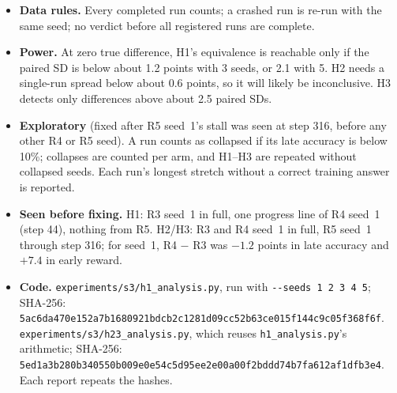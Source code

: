 \documentclass[11pt]{article}
\begin{document}
\begin{itemize}
\item \textbf{Data rules.} Every completed run counts; a crashed run is re-run with the same seed; no verdict before all registered runs are complete.
\item \textbf{Power.} At zero true difference, H1's equivalence is reachable only if the paired SD is below about 1.2 points with 3 seeds, or 2.1 with 5. H2 needs a single-run spread below about 0.6 points, so it will likely be inconclusive. H3 detects only differences above about 2.5 paired SDs.
\item \textbf{Exploratory} (fixed after R5 seed~1's stall was seen at step 316, before any other R4 or R5 seed). A run counts as collapsed if its late accuracy is below 10\%; collapses are counted per arm, and H1--H3 are repeated without collapsed seeds. Each run's longest stretch without a correct training answer is reported.
\item \textbf{Seen before fixing.} H1: R3 seed~1 in full, one progress line of R4 seed~1 (step 44), nothing from R5. H2/H3: R3 and R4 seed~1 in full, R5 seed~1 through step 316; for seed~1, R4 $-$ R3 was $-1.2$ points in late accuracy and $+7.4$ in early reward.
\item \textbf{Code.} \texttt{experiments/s3/h1\_analysis.py}, run with \texttt{-{}-seeds 1 2 3 4 5}; SHA-256:\\ \texttt{\small 5ac6da470e152a7b1680921bdcb2c1281d09cc52b63ce015f144c9c05f368f6f}.\\ \texttt{experiments/s3/h23\_analysis.py}, which reuses \texttt{h1\_analysis.py}'s arithmetic; SHA-256:\\ \texttt{\small 5ed1a3b280b340550b009e0e54c5d95ee2e00a00f2bddd74b7fa612af1dfb3e4}.\\ Each report repeats the hashes.
\end{itemize}
\end{document}
